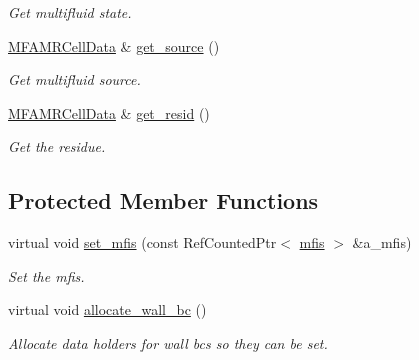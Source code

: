 \begin{DoxyCompactItemize}
\begin{DoxyCompactList}\small\item\em Get multifluid state. \end{DoxyCompactList}\item 
\hyperlink{type__definitions_8H_aced885351d40daa466564acbee4042d3}{M\+F\+A\+M\+R\+Cell\+Data} \& \hyperlink{classpoisson__solver_abcdc01a32eeaf1daf68316e406f950d6}{get\+\_\+source} ()
\begin{DoxyCompactList}\small\item\em Get multifluid source. \end{DoxyCompactList}\item 
\hyperlink{type__definitions_8H_aced885351d40daa466564acbee4042d3}{M\+F\+A\+M\+R\+Cell\+Data} \& \hyperlink{classpoisson__solver_aa38efe6f66e92543fccaaef627afb771}{get\+\_\+resid} ()
\begin{DoxyCompactList}\small\item\em Get the residue. \end{DoxyCompactList}\end{DoxyCompactItemize}
\subsection*{Protected Member Functions}
\begin{DoxyCompactItemize}
\item 
virtual void \hyperlink{classpoisson__solver_a04c9f69ad7c334e8cf7e7901922b2d82}{set\+\_\+mfis} (const Ref\+Counted\+Ptr$<$ \hyperlink{classmfis}{mfis} $>$ \&a\+\_\+mfis)
\begin{DoxyCompactList}\small\item\em Set the mfis. \end{DoxyCompactList}\item 
virtual void \hyperlink{classpoisson__solver_afa97ecbc1a23acd082985ba5abd21918}{allocate\+\_\+wall\+\_\+bc} ()
\begin{DoxyCompactList}\small\item\em Allocate data holders for wall bcs so they can be set. \end{DoxyCompactList}\end{DoxyCompactItemize}
